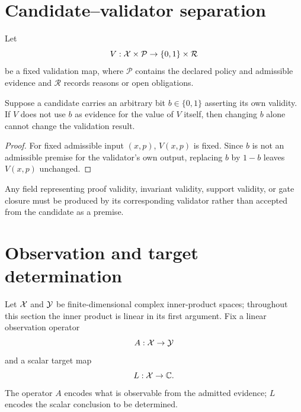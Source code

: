 \section{Candidate--validator separation}

\begin{definition}
Let
\begin{equation}
V:\mathcal X\times\mathcal P\to\{0,1\}\times\mathcal R
\label{eq:validator}
\end{equation}
be a fixed validation map, where $\mathcal P$ contains the declared policy and admissible evidence and $\mathcal R$ records reasons or open obligations.
\end{definition}

\begin{theorem}
Suppose a candidate carries an arbitrary bit $b\in\{0,1\}$ asserting its own validity. If $V$ does not use $b$ as evidence for the value of $V$ itself, then changing $b$ alone cannot change the validation result.
\end{theorem}

\begin{proof}
For fixed admissible input $(x,p)$, $V(x,p)$ is fixed. Since $b$ is not an admissible premise for the validator's own output, replacing $b$ by $1-b$ leaves $V(x,p)$ unchanged.
\end{proof}

\begin{corollary}
Any field representing proof validity, invariant validity, support validity, or gate closure must be produced by its corresponding validator rather than accepted from the candidate as a premise.
\end{corollary}

\section{Observation and target determination}

Let $\mathcal X$ and $\mathcal Y$ be finite-dimensional complex inner-product spaces; throughout this section the inner product is linear in its first argument. Fix a linear observation operator
\begin{equation}
A:\mathcal X\to\mathcal Y
\label{eq:A}
\end{equation}
and a scalar target map
\begin{equation}
L:\mathcal X\to\mathbb C.
\label{eq:L}
\end{equation}
The operator $A$ encodes what is observable from the admitted evidence; $L$ encodes the scalar conclusion to be determined.

